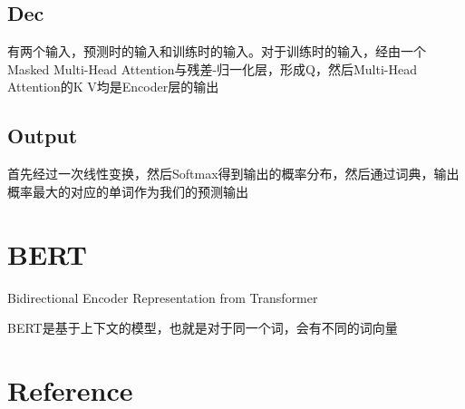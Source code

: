 \documentclass{article}
\begin{document}
\begin{sloppypar}
      \subsection{Dec}
      有两个输入，预测时的输入和训练时的输入。对于训练时的输入，经由一个Masked Multi-Head Attention与残差-归一化层，形成Q，然后Multi-Head Attention的K V均是Encoder层的输出
      \subsection{Output}
      首先经过一次线性变换，然后Softmax得到输出的概率分布，然后通过词典，输出概率最大的对应的单词作为我们的预测输出

      \section{BERT}

      Bidirectional Encoder Representation from Transformer


      BERT是基于上下文的模型，也就是对于同一个词，会有不同的词向量

      \newpage
      \section{Reference}

      \nocite{*} %

      
      

\end{sloppypar}
\end{document}
